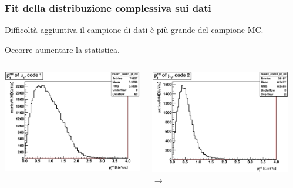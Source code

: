 \documentclass[italian]{beamer}
\begin{document}
\begin{frame}
    \frametitle{Fit della distribuzione complessiva sui dati}
    \begin{block}
        {Difficoltà aggiuntiva}
        il campione di dati è più grande del campione MC.
    \end{block}
    Occorre aumentare la statistica.
    \vspace{2\baselineskip}\\
    \begin{columns}
        \begin{column}{.3\textwidth}
            \includegraphics[width=.8\textwidth]{muon1_code1_pt_rel.eps}
            +
        \end{column}
        \begin{column}{.3\textwidth}
            \includegraphics[width=.8\textwidth]{muon1_code2_pt_rel.eps}
            $\rightarrow$
        \end{column}
        \begin{column}{.3\textwidth}

\end{column}
\end{columns}
\end{frame}
\end{document}

